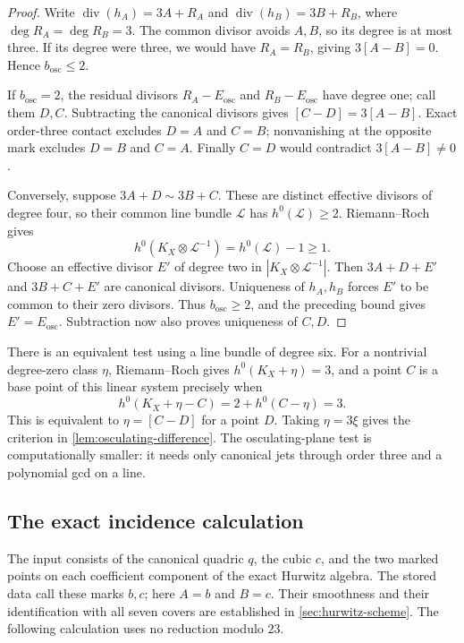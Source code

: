\documentclass[11pt]{amsart}
\theoremstyle{definition}
\theoremstyle{remark}
\begin{document}
\begin{proof}
Write $\operatorname{div}(h_A)=3A+R_A$ and
$\operatorname{div}(h_B)=3B+R_B$, where $\deg R_A=\deg R_B=3$.
The common divisor avoids $A,B$, so its degree is at most three.
If its degree were three, we would have $R_A=R_B$, giving
$3[A-B]=0$.  Hence $b_{\mathrm{osc}}\leq2$.

If $b_{\mathrm{osc}}=2$, the residual divisors
$R_A-E_{\mathrm{osc}}$ and $R_B-E_{\mathrm{osc}}$ have degree one;
call them $D,C$.  Subtracting the canonical divisors gives
$[C-D]=3[A-B]$.  Exact order-three contact excludes $D=A$ and $C=B$;
nonvanishing at the opposite mark excludes $D=B$ and $C=A$.
Finally $C=D$ would contradict $3[A-B]\ne0$.

Conversely, suppose $3A+D\sim3B+C$.  These are distinct effective
divisors of degree four, so their common line bundle $\mathcal L$
has $h^0(\mathcal L)\geq2$.  Riemann--Roch gives
\[
 h^0(K_X\otimes\mathcal L^{-1})=h^0(\mathcal L)-1\geq1.
\]
Choose an effective divisor $E'$ of degree two in
$|K_X\otimes\mathcal L^{-1}|$.
Then $3A+D+E'$ and $3B+C+E'$ are canonical divisors.
Uniqueness of $h_A,h_B$ forces $E'$ to be common to their zero
divisors.  Thus $b_{\mathrm{osc}}\geq2$, and the preceding bound gives
$E'=E_{\mathrm{osc}}$.  Subtraction now also proves uniqueness of
$C,D$.
\end{proof}

There is an equivalent test using a line bundle of degree six.
For a nontrivial degree-zero class $\eta$, Riemann--Roch gives
$h^0(K_X+\eta)=3$, and a point $C$ is a base point of this linear
system precisely when
\[
 h^0(K_X+\eta-C)=2+h^0(C-\eta)=3.
\]
This is equivalent to $\eta=[C-D]$ for a point $D$.
Taking $\eta=3\xi$ gives the criterion in
\cref{lem:osculating-difference}.  The osculating-plane test is
computationally smaller: it needs only canonical jets through order
three and a polynomial gcd on a line.

\subsection{The exact incidence calculation}

The input consists of the canonical quadric $q$, the cubic $c$, and
the two marked points on each coefficient component of the exact
Hurwitz algebra.  The stored data call these marks $b,c$; here
$A=b$ and $B=c$.  Their smoothness and their identification with all
seven covers are established in \cref{sec:hurwitz-scheme}.
The following calculation uses no reduction modulo $23$.
\end{document}
